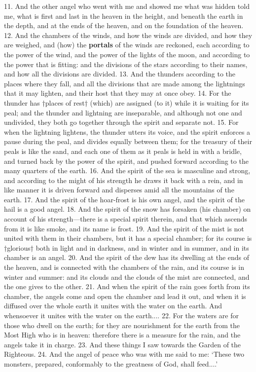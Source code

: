 11. And the other angel who went with me and
showed me what was hidden told me, what is first
and last in the heaven in the height, and beneath
the earth in the depth, and at the ends of the heaven,
and on the foundation of the heaven. 12. And the
chambers of the winds, and how the winds are divided,
and how they are weighed, and (how) the \textbf{portals} of
the winds are reckoned, each according to the power
of the wind, and the power of the lights of the moon,
and according to the power that is fitting: and the
divisions of the stars according to their names, and
how all the divisions are divided. 13. And the
thunders according to the places where they fall, and
all the divisions that are made among the lightnings
that it may lighten, and their host that they may at
once obey. 14. For the thunder has †places of rest†
(which) are assigned (to it) while it is waiting for its
peal; and the thunder and lightning are inseparable,
and although not one and undivided, they both go together
through the spirit and separate not. 15. For
when the lightning lightens, the thunder utters its
voice, and the spirit enforces a pause during the
peal, and divides equally between them; for the
treasury of their peals is like the sand, and each one
of them as it peals is held in with a bridle, and turned
back by the power of the spirit, and pushed forward
according to the many quarters of the earth. 16. And
the spirit of the sea is masculine and strong, and
according to the might of his strength he draws it
back with a rein, and in like manner it is driven
forward and disperses amid all the mountains of the
earth. 17. And the spirit of the hoar-frost is his
own angel, and the spirit of the hail is a good angel.
18. And the spirit of the snow has forsaken (his
chamber) on account of his strength—there is a
special spirit therein, and that which ascends from it is
like smoke, and its name is frost. 19. And the spirit
of the mist is not united with them in their chambers,
but it has a special chamber; for its course is †glorious†
both in light and in darkness, and in winter and
in summer, and in its chamber is an angel. 20. And
the spirit of the dew has its dwelling at the ends of
the heaven, and is connected with the chambers of
the rain, and its course is in winter and summer: and
its clouds and the clouds of the mist are connected,
and the one gives to the other. 21. And when the
spirit of the rain goes forth from its chamber, the
angels come and open the chamber and lead it out,
and when it is diffused over the whole earth it unites
with the water on the earth. And whensoever it
unites with the water on the earth.... 22. For
the waters are for those who dwell on the earth; for
they are nourishment for the earth from the Most
High who is in heaven: therefore there is a measure
for the rain, and the angels take it in charge.
23. And these things I saw towards the Garden of
the Righteous. 24. And the angel of peace who was
with me said to me: ‘These two monsters, prepared,
conformably to the greatness of God, shall feed....’

